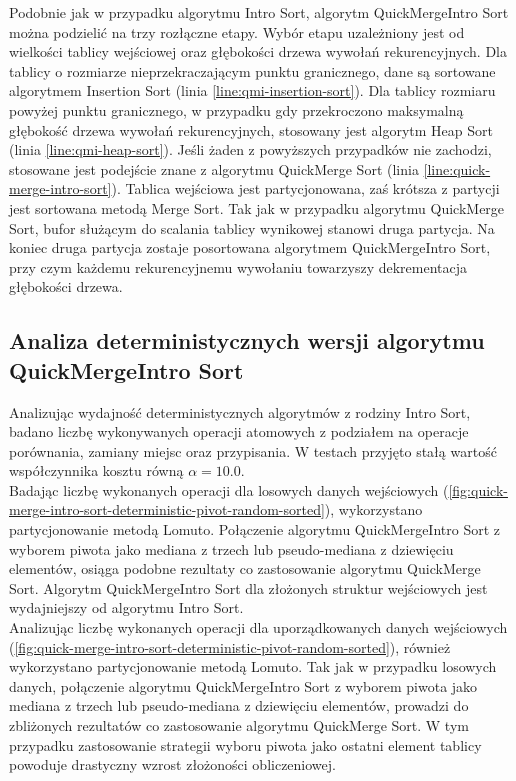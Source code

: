 Podobnie jak w przypadku algorytmu Intro Sort, algorytm QuickMergeIntro Sort można podzielić na trzy rozłączne etapy. Wybór etapu uzależniony jest od wielkości tablicy wejściowej oraz głębokości drzewa wywołań rekurencyjnych. Dla tablicy o rozmiarze nieprzekraczającym punktu granicznego, dane są sortowane algorytmem Insertion Sort (linia \ref{line:qmi-insertion-sort}). Dla tablicy rozmiaru powyżej punktu granicznego, w przypadku gdy przekroczono maksymalną głębokość drzewa wywołań rekurencyjnych, stosowany jest algorytm Heap Sort (linia \ref{line:qmi-heap-sort}). Jeśli żaden z powyższych przypadków nie zachodzi, stosowane jest podejście znane z algorytmu QuickMerge Sort (linia \ref{line:quick-merge-intro-sort}). Tablica wejściowa jest partycjonowana, zaś krótsza z partycji jest sortowana metodą Merge Sort. Tak jak w przypadku algorytmu QuickMerge Sort, bufor służącym do scalania tablicy wynikowej stanowi druga partycja. Na koniec druga partycja zostaje posortowana algorytmem QuickMergeIntro Sort, przy czym każdemu rekurencyjnemu wywołaniu towarzyszy dekrementacja głębokości drzewa.\\



\subsection{Analiza deterministycznych wersji algorytmu QuickMergeIntro Sort}
Analizując wydajność deterministycznych algorytmów z rodziny Intro Sort, badano liczbę wykonywanych operacji atomowych z podziałem na operacje porównania, zamiany miejsc oraz przypisania. W testach przyjęto stałą wartość współczynnika kosztu równą $\alpha = 10.0$.\\

Badając liczbę wykonanych operacji dla losowych danych wejściowych (\ref{fig:quick-merge-intro-sort-deterministic-pivot-random-sorted}), wykorzystano partycjonowanie metodą Lomuto.
Połączenie algorytmu QuickMergeIntro Sort z wyborem piwota jako mediana z trzech lub pseudo-mediana z dziewięciu elementów, osiąga podobne rezultaty co zastosowanie algorytmu QuickMerge Sort. Algorytm QuickMergeIntro Sort dla złożonych struktur wejściowych jest wydajniejszy od algorytmu Intro Sort.\\

Analizując liczbę wykonanych operacji dla uporządkowanych danych wejściowych (\ref{fig:quick-merge-intro-sort-deterministic-pivot-random-sorted}), również wykorzystano partycjonowanie metodą Lomuto. Tak jak w przypadku losowych danych, połączenie algorytmu QuickMergeIntro Sort z wyborem piwota jako mediana z trzech lub pseudo-mediana z dziewięciu elementów, prowadzi do zbliżonych rezultatów co zastosowanie algorytmu QuickMerge Sort. W tym przypadku zastosowanie strategii wyboru piwota jako ostatni element tablicy powoduje drastyczny wzrost złożoności obliczeniowej.\\

